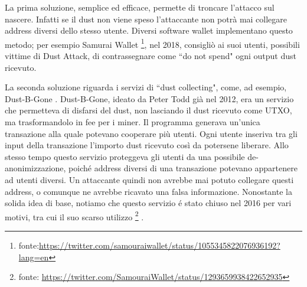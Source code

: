 La prima soluzione, semplice ed efficace, permette di troncare l'attacco sul nascere. Infatti se il dust non viene speso l'attaccante non potrà mai collegare address diversi dello stesso utente.  Diversi software wallet implementano questo metodo; per esempio Samurai Wallet \footnote{fonte:\url{https://twitter.com/samouraiwallet/status/1055345822076936192?lang=en}}, nel 2018, consigliò ai suoi utenti, possibili vittime di Dust Attack,  di contrassegnare come ``do not spend" ogni output dust ricevuto.

La seconda soluzione riguarda i servizi di ``dust collecting", come, ad esempio, Dust-B-Gone \cite{Dbg}.
Dust-B-Gone, ideato da Peter Todd già nel 2012, era un servizio che permetteva di disfarsi del dust, non lasciando il dust ricevuto come UTXO, ma trasformandolo in fee per i miner. Il programma generava un'unica transazione alla quale potevano cooperare più utenti. Ogni utente inseriva tra gli input della transazione l'importo dust ricevuto così da potersene liberare. Allo stesso tempo questo servizio proteggeva gli utenti da una possibile de-anonimizzazione, poiché address diversi di una transazione potevano appartenere ad utenti diversi. Un attaccante quindi non avrebbe mai potuto collegare questi address, o comunque ne avrebbe ricavato una falsa informazione.
Nonostante la solida idea di base, notiamo che questo servizio é stato chiuso nel 2016 per vari motivi, tra cui il suo scarso utilizzo \footnote{fonte: \url{https://twitter.com/SamouraiWallet/status/1293659938422652935}} . 